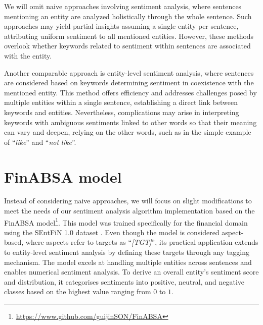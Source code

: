 We will omit naive approaches involving sentiment analysis, where sentences mentioning an entity are analyzed holistically through the whole sentence. Such approaches may yield partial insights assuming a single entity per sentence, attributing uniform sentiment to all mentioned entities. However, these methods overlook whether keywords related to sentiment within sentences are associated with the entity.

Another comparable approach is entity-level sentiment analysis, where sentences are considered based on keywords determining sentiment in coexistence with the mentioned entity. This method offers efficiency and addresses challenges posed by multiple entities within a single sentence, establishing a direct link between keywords and entities. Nevertheless, complications may arise in interpreting keywords with ambiguous sentiments linked to other words so that their meaning can vary and deepen, relying on the other words, such as in the simple example of ``\textit{like}'' and ``\textit{not like}''.

\section{FinABSA model}
\label{sec:elsa-finabsa-model}
Instead of considering naive approaches, we will focus on slight modifications to meet the needs of our sentiment analysis algorithm implementation based on the FinABSA model\footnote{\href{https://www.github.com/guijinSON/FinABxwSA}{https://www.github.com/guijinSON/FinABSA}}. This model was trained specifically for the financial domain using the SEntFiN 1.0 dataset \parencite{sentfin}. Even though the model is considered aspect-based, where aspects refer to targets as ``\textit{[TGT]}'', its practical application extends to entity-level sentiment analysis by defining these targets through any tagging mechanism. The model excels at handling multiple entities across sentences and enables numerical sentiment analysis. To derive an overall entity's sentiment score and distribution, it categorises sentiments into positive, neutral, and negative classes based on the highest value ranging from $0$ to $1$.

